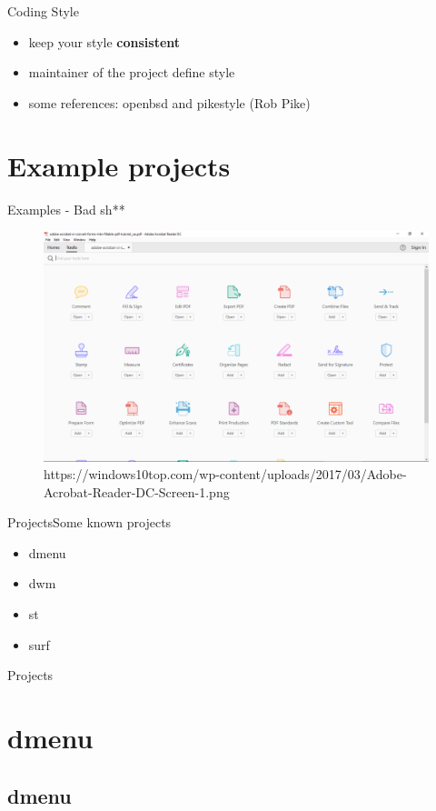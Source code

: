 \documentclass[10pt,graphics,aspectratio=169,table]{beamer}
\begin{document}
\begin{frame}{Coding Style}
	 \begin{itemize}
	 	\item keep your style {\bf consistent}
	 	\item maintainer of the project define style
	 	\item some references: openbsd and pikestyle (Rob Pike)
	 \end{itemize}
\end{frame}

\section{Example projects}

\begin{frame}{Examples - Bad sh**}
	\begin{figure}
		\includegraphics[scale=0.2]{Adobe-Acrobat-Reader-DC-Screen-1.png}
		\caption{https://windows10top.com/wp-content/uploads/2017/03/Adobe-Acrobat-Reader-DC-Screen-1.png}
	\end{figure}	
\end{frame}

\begin{frame}{Projects}{Some known projects}
	\begin{itemize}
		\item dmenu
		\item dwm
		\item st
		\item surf
	\end{itemize}
	
\end{frame}

\begin{frame}{Projects}
    \section*{dmenu}
    \subsection{dmenu}
\end{frame}
\end{document}
